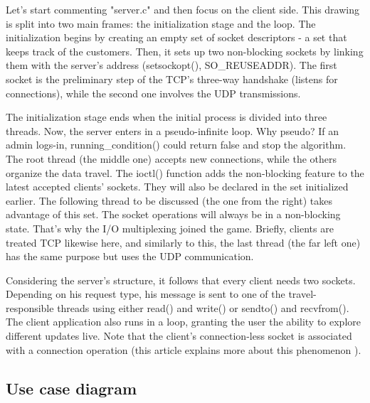 \documentclass[runningheads]{llncs}
\begin{document}
Let's start commenting "server.c" and then focus on the client side. This drawing is split into two main frames: the initialization stage and the loop. The initialization begins by creating an empty set of socket descriptors - a set that keeps track of the customers. Then, it sets up two non-blocking sockets by linking them with the server's address (setsockopt(), SO\_REUSEADDR). The first socket is the preliminary step of the TCP's three-way handshake (listens for connections), while the second one involves the UDP transmissions.

The initialization stage ends when the initial process is divided into three threads. Now, the server enters in a pseudo-infinite loop. Why pseudo? If an admin logs-in, running\_condition() could return false and stop the algorithm. The root thread (the middle one) accepts new connections, while the others organize the data travel. The ioctl() function adds the non-blocking feature to the latest accepted clients' sockets. They will also be declared in the set initialized earlier. The following thread to be discussed (the one from the right) takes advantage of this set. The socket operations will always be in a non-blocking state. That's why the I/O multiplexing joined the game. Briefly, clients are treated TCP likewise here, and similarly to this, the last thread (the far left one) has the same purpose but uses the UDP communication.

Considering the server's structure, it follows that every client needs two sockets. Depending on his request type, his message is sent to one of the travel-responsible threads using either read() and write() or sendto() and recvfrom(). The client application also runs in a loop, granting the user the ability to explore different updates live. Note that the client's connection-less socket is associated with a connection operation (this article explains more about this phenomenon \cite{udp-connect}).

\subsection{Use case diagram}
\end{document}
